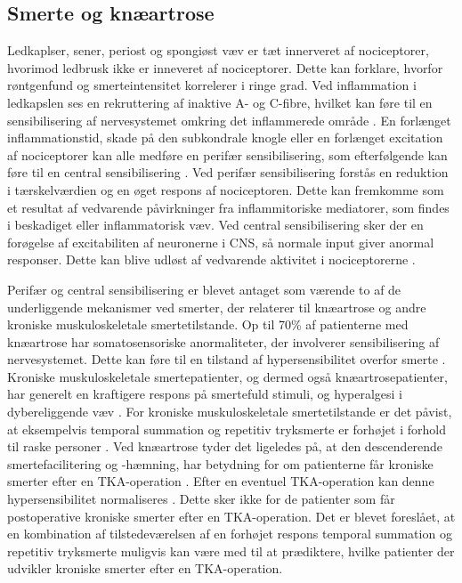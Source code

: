 \subsection{Smerte og knæartrose}
Ledkaplser, sener, periost og spongiøst væv er tæt innerveret af nociceptorer, hvorimod ledbrusk ikke er inneveret af nociceptorer. Dette kan forklare, hvorfor  røntgenfund og smerteintensitet korrelerer i ringe grad. \citep{Petersen2016}  \citep{smerter}
Ved inflammation i ledkapslen ses en rekruttering af inaktive A- og C-fibre, hvilket kan føre til en sensibilisering af nervesystemet omkring det inflammerede område \citep{smerter}. En forlænget inflammationstid, skade på den subkondrale knogle eller en forlænget excitation af nociceptorer kan alle medføre en perifær sensibilisering, som efterfølgende kan føre til en central sensibilisering \citep{Petersen2016}.
Ved perifær sensibilisering forstås en reduktion i tærskelværdien og en øget respons af nociceptoren. Dette kan fremkomme som et resultat af vedvarende påvirkninger fra inflammitoriske mediatorer, som findes i beskadiget eller inflammatorisk væv. 
Ved central sensibilisering sker der en forøgelse af excitabiliten af neuronerne i CNS, så normale input giver anormal responser. Dette kan blive udløst af vedvarende aktivitet i nociceptorerne \citep{nature}.

Perifær og central sensibilisering er blevet antaget som værende to af de underliggende mekanismer ved smerter, der relaterer til knæartrose og andre kroniske muskuloskeletale smertetilstande. Op til 70\% af patienterne med knæartrose har somatosensoriske anormaliteter, der involverer sensibilisering af nervesystemet.  \citep{Arendt-Nielsen2010}  Dette kan føre til en tilstand af hypersensibilitet overfor smerte \citep{Petersen2016}. Kroniske muskuloskeletale smertepatienter, og dermed også knæartrosepatienter, har generelt en kraftigere respons på smertefuld stimuli, og hyperalgesi i dybereliggende væv \citep{Arendt-Nielsen2010}. For kroniske muskuloskeletale smertetilstande er det påvist, at eksempelvis temporal summation og repetitiv tryksmerte er forhøjet i forhold til raske personer \citep{graven2012}. Ved knæartrose tyder det ligeledes på, at den descenderende smertefacilitering og -hæmning, har betydning for om patienterne får kroniske smerter efter en TKA-operation \citep{Petersen2016}. Efter en eventuel TKA-operation kan denne hypersensibilitet normaliseres \citep{Petersen2016}  \citep{graven2012}. Dette sker ikke for de patienter som får postoperative kroniske smerter efter en TKA-operation. 
Det er blevet foreslået, at en kombination af tilstedeværelsen af en forhøjet respons temporal summation og repetitiv tryksmerte muligvis kan være med til at prædiktere, hvilke patienter der udvikler kroniske smerter efter en TKA-operation. \citep{Petersen2016}


